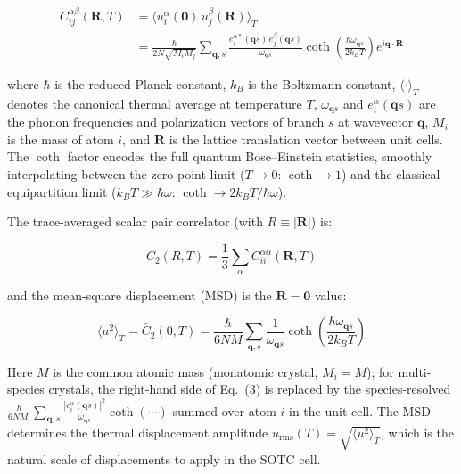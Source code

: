 \documentclass[aps,prb,reprint,amsmath,amssymb,floatfix]{revtex4-2}
\begin{document}
{\footnotesize
\begin{align}
C_{ij}^{\alpha\beta}(\mathbf{R},T)
  &= \langle u_i^\alpha(\mathbf{0})\, u_j^\beta(\mathbf{R})\rangle_T \nonumber \\
  &= \frac{\hbar}{2N\sqrt{M_i M_j}} \sum_{\mathbf{q},s}
     \frac{e_i^{\alpha*}(\mathbf{q}s)\,e_j^{\beta}(\mathbf{q}s)}{\omega_{\mathbf{q}s}}
     \coth\!\left(\frac{\hbar\omega_{\mathbf{q}s}}{2k_BT}\right) e^{i\mathbf{q}\cdot\mathbf{R}} \tag{1}
\end{align}
}

where \(\hbar\) is the reduced Planck constant, \(k_B\) is the
Boltzmann constant, \(\langle\cdot\rangle_T\) denotes the canonical
thermal average at temperature \(T\), \(\omega_{\mathbf{q}s}\) and
\(e_i^\alpha(\mathbf{q}s)\) are the phonon frequencies and polarization
vectors of branch \(s\) at wavevector \(\mathbf{q}\), \(M_i\) is the
mass of atom \(i\), and \(\mathbf{R}\) is the lattice translation vector
between unit cells.
The \(\coth\) factor encodes the full quantum Bose--Einstein statistics,
smoothly interpolating between the zero-point limit (\(T\to 0\):
\(\coth\to 1\)) and the classical equipartition limit
(\(k_BT\gg\hbar\omega\): \(\coth\to 2k_BT/\hbar\omega\)).

The trace-averaged scalar pair correlator (with $R\equiv|\mathbf{R}|$) is:

\begin{equation}
\bar{C}_2(R, T) = \frac{1}{3}\sum_\alpha C_{ii}^{\alpha\alpha}(\mathbf{R},T) \tag{2}
\end{equation}

and the mean-square displacement (MSD) is the \(\mathbf{R}=\mathbf{0}\)
value:

\begin{equation}
\langle u^2\rangle_T = \bar{C}_2(0,T) = \frac{\hbar}{6NM}\sum_{\mathbf{q},s} \frac{1}{\omega_{\mathbf{q}s}} \coth\!\left(\frac{\hbar\omega_{\mathbf{q}s}}{2k_BT}\right) \tag{3}
\end{equation}

Here \(M\) is the common atomic mass (monatomic crystal, \(M_i=M\));
for multi-species crystals, the right-hand side of Eq.~(3) is replaced
by the species-resolved
\(\frac{\hbar}{6NM_i}\sum_{\mathbf{q},s}\frac{|e_i^\alpha(\mathbf{q}s)|^2}{\omega_{\mathbf{q}s}}\coth(\cdots)\)
summed over atom \(i\) in the unit cell. The MSD determines the thermal
displacement amplitude
\(u_\text{rms}(T) = \sqrt{\langle u^2\rangle_T}\), which is the natural
scale of displacements to apply in the SOTC cell.
\end{document}
